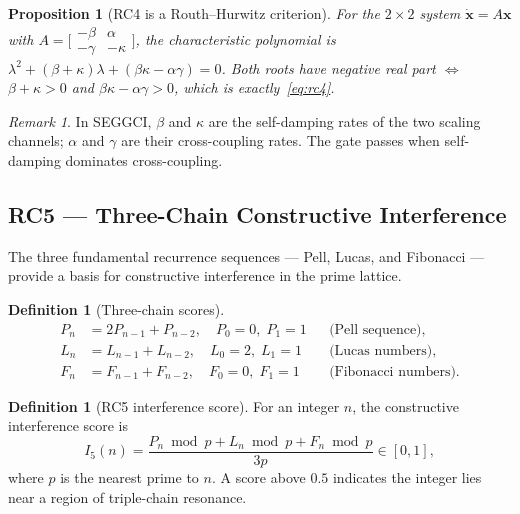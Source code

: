 \documentclass[12pt,a4paper]{article}
\theoremstyle{plain}
\newtheorem{proposition}[theorem]{Proposition}
\theoremstyle{definition}
\newtheorem{definition}[theorem]{Definition}
\theoremstyle{remark}
\newtheorem{remark}[theorem]{Remark}
\begin{document}
\begin{proposition}[RC4 is a Routh--Hurwitz criterion]
For the $2\times 2$ system $\dot{\mathbf{x}} = A\mathbf{x}$ with
$A = \bigl[\begin{smallmatrix}-\beta & \alpha \\ -\gamma &
-\kappa\end{smallmatrix}\bigr]$,
the characteristic polynomial is
$\lambda^2 + (\beta+\kappa)\lambda + (\beta\kappa-\alpha\gamma) = 0$.
Both roots have negative real part $\Leftrightarrow$
$\beta+\kappa > 0$ and $\beta\kappa-\alpha\gamma > 0$,
which is exactly~\eqref{eq:rc4}.
\end{proposition}

\begin{remark}
In SEGGCI, $\beta$ and $\kappa$ are the self-damping rates of the
two scaling channels; $\alpha$ and $\gamma$ are their cross-coupling
rates.  The gate passes when self-damping dominates cross-coupling.
\end{remark}

\subsection{RC5 --- Three-Chain Constructive Interference}
\label{sec:rc5}

The three fundamental recurrence sequences --- Pell, Lucas, and
Fibonacci --- provide a basis for constructive interference in the
prime lattice.

\begin{definition}[Three-chain scores]
\begin{align}
P_n &= 2P_{n-1} + P_{n-2}, \quad P_0 = 0,\; P_1 = 1
    && \text{(Pell sequence)}, \\
L_n &= L_{n-1} + L_{n-2}, \quad L_0 = 2,\; L_1 = 1
    && \text{(Lucas numbers)}, \\
F_n &= F_{n-1} + F_{n-2}, \quad F_0 = 0,\; F_1 = 1
    && \text{(Fibonacci numbers)}.
\end{align}
\end{definition}

\begin{definition}[RC5 interference score]
For an integer $n$, the constructive interference score is
\begin{equation}
I_5(n) = \frac{P_n \bmod p + L_n \bmod p + F_n \bmod p}{3p}
         \in [0,1],
\end{equation}
where $p$ is the nearest prime to $n$.  A score above $0.5$ indicates
the integer lies near a region of triple-chain resonance.
\end{definition}
\end{document}
